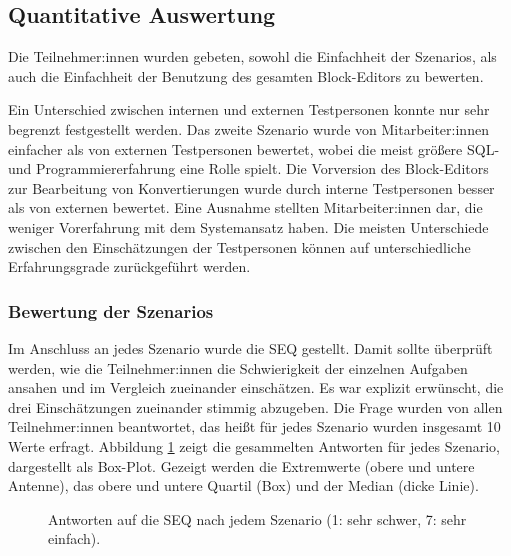 \subsection{Quantitative Auswertung}
\label{sec:quantitative}

Die Teilnehmer:innen wurden gebeten, sowohl die Einfachheit der Szenarios, als auch die Einfachheit der Benutzung des gesamten Block-Editors zu bewerten.

Ein Unterschied zwischen internen und externen Testpersonen konnte nur sehr begrenzt festgestellt werden. Das zweite Szenario wurde von Mitarbeiter:innen einfacher als von externen Testpersonen bewertet, wobei die meist größere \ac{SQL}- und Programmiererfahrung eine Rolle spielt. Die Vorversion des Block-Editors zur Bearbeitung von Konvertierungen wurde durch interne Testpersonen besser als von externen bewertet. Eine Ausnahme stellten Mitarbeiter:innen dar, die weniger Vorerfahrung mit dem Systemansatz haben. Die meisten Unterschiede zwischen den Einschätzungen der Testpersonen können auf unterschiedliche  Erfahrungsgrade zurückgeführt werden.

\subsubsection{Bewertung der Szenarios}

Im Anschluss an jedes Szenario wurde die \ac{SEQ} gestellt. Damit sollte überprüft werden, wie die Teilnehmer:innen die Schwierigkeit der einzelnen Aufgaben ansahen und im Vergleich zueinander einschätzen. Es war explizit erwünscht, die drei Einschätzungen zueinander stimmig abzugeben. Die Frage wurden von allen Teilnehmer:innen beantwortet, das heißt für jedes Szenario wurden insgesamt 10 Werte erfragt. Abbildung \ref{fig:seq} zeigt die gesammelten Antworten für jedes Szenario, dargestellt als Box-Plot. Gezeigt werden die Extremwerte (obere und untere Antenne), das obere und untere Quartil (Box) und der Median (dicke Linie).

\begin{figure}[!ht]
  \datatable
  \centering
  \caption{Antworten auf die \acs{SEQ} nach jedem Szenario (1: sehr schwer, 7: sehr einfach).}
  \label{fig:seq}
\end{figure}

